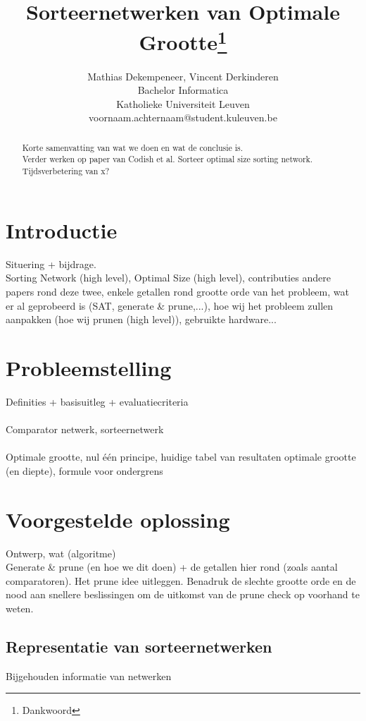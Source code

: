 \documentclass{article}
\title{Sorteernetwerken van Optimale Grootte\thanks{Dankwoord}}
\author{Mathias Dekempeneer, Vincent Derkinderen \\
Bachelor Informatica\\
Katholieke Universiteit Leuven \\
{voornaam.achternaam}@student.kuleuven.be}
\begin{document}
\maketitle

\begin{abstract}
Korte samenvatting van wat we doen en wat de conclusie is.\\
Verder werken op paper van Codish et al. Sorteer optimal size sorting network.\\
Tijdsverbetering van x?
\end{abstract}

\section{Introductie}

Situering + bijdrage.\\
Sorting Network (high level), Optimal Size (high level), contributies andere papers rond deze twee, enkele getallen rond grootte orde van het probleem, wat er al geprobeerd is (SAT, generate \& prune,...), hoe wij het probleem zullen aanpakken (hoe wij prunen (high level)), gebruikte hardware...

\section{Probleemstelling}
Definities + basisuitleg + evaluatiecriteria\\ \\
Comparator netwerk, sorteernetwerk\\ \\
Optimale grootte, nul \'e\'en principe, huidige tabel van resultaten optimale grootte (en diepte), formule voor ondergrens

\section{Voorgestelde oplossing}
Ontwerp, wat (algoritme)\\
Generate \& prune (en hoe we dit doen) + de getallen hier rond (zoals aantal comparatoren). Het prune idee uitleggen. Benadruk de slechte grootte orde en de nood aan snellere beslissingen om de uitkomst van de prune check op voorhand te weten.

\subsection{Representatie van sorteernetwerken}
Bijgehouden informatie van netwerken
\end{document}
